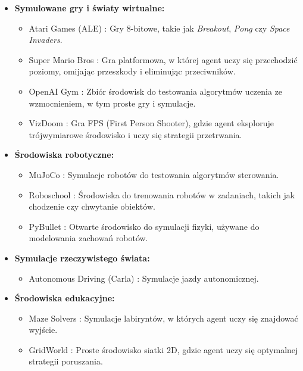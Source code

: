 \begin{itemize}
	\item \textbf{Symulowane gry i światy wirtualne:}
	      \begin{itemize}
		      \item Atari Games (ALE) \cite{BELLEMARE2013}: Gry 8-bitowe, takie jak \textit{Breakout}, \textit{Pong} czy \textit{Space Invaders}.
		      \item Super Mario Bros \cite{KARPATHY2015}: Gra platformowa, w której agent uczy się przechodzić poziomy, omijając przeszkody i eliminując przeciwników.
		      \item OpenAI Gym \cite{BROCKMAN2016}: Zbiór środowisk do testowania algorytmów uczenia ze wzmocnieniem, w tym proste gry i symulacje.
		      \item VizDoom \cite{KEMPKA2016}: Gra FPS (First Person Shooter), gdzie agent eksploruje trójwymiarowe środowisko i uczy się strategii przetrwania.
	      \end{itemize}

	\item \textbf{Środowiska robotyczne:}
	      \begin{itemize}
		      \item MuJoCo \cite{TODOROV2012}: Symulacje robotów do testowania algorytmów sterowania.
		      \item Roboschool \cite{SCHULMAN2017}: Środowiska do trenowania robotów w zadaniach, takich jak chodzenie czy chwytanie obiektów.
		      \item PyBullet \cite{COUMANS2016}: Otwarte środowisko do symulacji fizyki, używane do modelowania zachowań robotów.
	      \end{itemize}

	\item \textbf{Symulacje rzeczywistego świata:}
	      \begin{itemize}
		      \item Autonomous Driving (Carla) \cite{DOSOVITSKIY2017}: Symulacje jazdy autonomicznej.
	      \end{itemize}

	\item \textbf{Środowiska edukacyjne:}
	      \begin{itemize}
		      \item Maze Solvers \cite{SUTTON2018}: Symulacje labiryntów, w których agent uczy się znajdować wyjście.
		      \item GridWorld \cite{RUSSELL2003}: Proste środowisko siatki 2D, gdzie agent uczy się optymalnej strategii poruszania.
	      \end{itemize}
\end{itemize}

